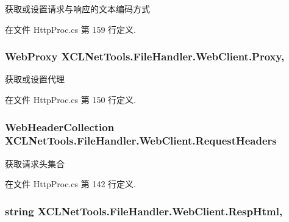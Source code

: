 获取或设置请求与响应的文本编码方式 



在文件 Http\-Proc.\-cs 第 159 行定义.

\hypertarget{class_x_c_l_net_tools_1_1_file_handler_1_1_web_client_ac2f17eefdc2372eb01a6be915d19c0ba}{
\subsubsection[{Proxy}]{\setlength{\rightskip}{0pt plus 5cm}Web\-Proxy X\-C\-L\-Net\-Tools.\-File\-Handler.\-Web\-Client.\-Proxy\hspace{0.3cm}{\ttfamily [get]}, {\ttfamily [set]}}}\label{class_x_c_l_net_tools_1_1_file_handler_1_1_web_client_ac2f17eefdc2372eb01a6be915d19c0ba}


获取或设置代理 



在文件 Http\-Proc.\-cs 第 150 行定义.

\hypertarget{class_x_c_l_net_tools_1_1_file_handler_1_1_web_client_a89d4bf2af70a2a0991904b1b61c8dd1d}{
\subsubsection[{Request\-Headers}]{\setlength{\rightskip}{0pt plus 5cm}Web\-Header\-Collection X\-C\-L\-Net\-Tools.\-File\-Handler.\-Web\-Client.\-Request\-Headers\hspace{0.3cm}{\ttfamily [get]}}}\label{class_x_c_l_net_tools_1_1_file_handler_1_1_web_client_a89d4bf2af70a2a0991904b1b61c8dd1d}


获取请求头集合 



在文件 Http\-Proc.\-cs 第 142 行定义.

\hypertarget{class_x_c_l_net_tools_1_1_file_handler_1_1_web_client_a67e90e96bd067171c16cb84d75f66c3a}{
\subsubsection[{Resp\-Html}]{\setlength{\rightskip}{0pt plus 5cm}string X\-C\-L\-Net\-Tools.\-File\-Handler.\-Web\-Client.\-Resp\-Html\hspace{0.3cm}{\ttfamily [get]}, {\ttfamily [set]}}}\label{class_x_c_l_net_tools_1_1_file_handler_1_1_web_client_a67e90e96bd067171c16cb84d75f66c3a}


